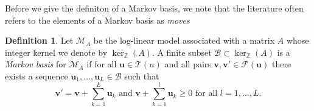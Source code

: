 \documentclass[11pt]{amsart}
\theoremstyle{plain}
\theoremstyle{definition}
\newtheorem{defi}{Definition}
\begin{document}
Before we give the definiton of a Markov basis, we note that the literature often refers to the elements of a Markov basis as \emph{moves}\cite[p.16]{bernd}
\begin{defi}
\cite{bernd}
Let $\mathcal{M}_A$ be the log-linear model associated with a matrix $A$ whose integer kernel we denote by $\ker_\mathbb{Z}(A)$.
A finite subset $\mathcal{B}\subset\ker_{\mathbb{Z}}(A)$ is a \emph{Markov basis} for $\mathcal{M}_A$ if for all $\mathbf{u}\in \mathcal{T}(n)$ and all pairs $\mathbf{v},\mathbf{v}'\in \mathcal{F}(\mathbf{u})$ there exists a sequence $\mathbf{u}_1,\dots,\mathbf{u}_L\in  \mathcal{B}$ such that
\[\mathbf{v}'=\mathbf{v}+\sum\limits_{k=1}^L{\mathbf{u}_k}\text{ and }\mathbf{v}+\sum\limits_{k=1}^l{\mathbf{u}_k}\ge 0\text{ for all }l=1,\dots,L.\]
\end{defi}
\end{document}

